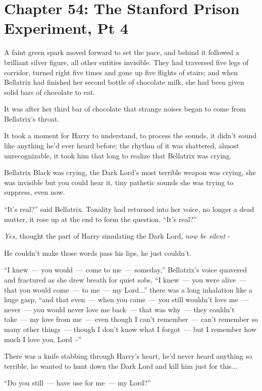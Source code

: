 \chapter{Chapter 54: The Stanford Prison Experiment, Pt 4}
A faint green spark moved forward to set the pace, and behind it followed a brilliant silver figure, all other entities invisible. They had traversed five legs of corridor, turned right five times and gone up five flights of stairs; and when Bellatrix had finished her second bottle of chocolate milk, she had been given solid bars of chocolate to eat.

It was after her third bar of chocolate that strange noises began to come from Bellatrix's throat.

It took a moment for Harry to understand, to process the sounds, it didn't sound like anything he'd ever heard before; the rhythm of it was shattered, almost unrecognizable, it took him that long to realize that Bellatrix was crying.

Bellatrix Black was crying, the Dark Lord's most terrible weapon was crying, she was invisible but you could hear it, tiny pathetic sounds she was trying to suppress, even now.

``It's real?'' said Bellatrix. Tonality had returned into her voice, no longer a dead mutter, it rose up at the end to form the question. ``It's real?''

\emph{Yes,} thought the part of Harry simulating the Dark Lord, \emph{now be silent} -

He couldn't make those words pass his lips, he just couldn't.

``I knew~--- you would~--- come to me~--- someday,'' Bellatrix's voice quavered and fractured as she drew breath for quiet sobs, ``I knew~--- you were alive~--- that you would come~--- to me~--- my Lord...'' there was a long inhalation like a huge gasp, ``and that even~--- when you came~--- you still wouldn't love me~--- never~--- you would never love me back~--- that was why~--- they couldn't take~--- my love from me~--- even though I can't remember~--- can't remember so many other things~--- though I don't know what I forgot~--- but I remember how much I love you, Lord~-''

There was a knife stabbing through Harry's heart, he'd never heard anything so terrible, he wanted to hunt down the Dark Lord and kill him just for this...

``Do you still~--- have use for me~--- my Lord?''

